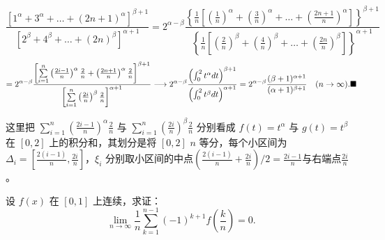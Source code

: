 \documentclass[lang=cn,newtx,10pt,scheme=chinese]{elegantbook}
\begin{document}
\begin{solution}

$$ \frac{[1^\alpha + 3^\alpha + \dots + (2n+1)^\alpha]^{\beta+1}}{[2^\beta + 4^\beta + \dots + (2n)^\beta]^{\alpha+1}} = 2^{\alpha-\beta} \frac{\left\{ \frac{1}{n} \left[ \left(\frac{1}{n}\right)^\alpha + \left(\frac{3}{n}\right)^\alpha + \dots + \left(\frac{2n+1}{n}\right)^\alpha \right] \right\}^{\beta+1}}{\left\{ \frac{1}{n} \left[ \left(\frac{2}{n}\right)^\beta + \left(\frac{4}{n}\right)^\beta + \dots + \left(\frac{2n}{n}\right)^\beta \right] \right\}^{\alpha+1}} $$
$$ = 2^{\alpha-\beta} \frac{\left[ \sum\limits_{i=1}^{n} \left(\frac{2i-1}{n}\right)^\alpha \frac{2}{n} + \left(\frac{2n+1}{n}\right)^\alpha \frac{2}{n} \right]^{\beta+1}}{\left[ \sum\limits_{i=1}^{n} \left(\frac{2i}{n}\right)^\beta \frac{2}{n} \right]^{\alpha+1}} \longrightarrow 2^{\alpha-\beta} \frac{\left( \int_0^2 t^\alpha dt \right)^{\beta+1}}{\left( \int_0^2 t^\beta dt \right)^{\alpha+1}} = 2^{\alpha-\beta} \frac{(\beta+1)^{\alpha+1}}{(\alpha+1)^{\beta+1}} \quad (n \to \infty). \hfill \blacksquare$$ 
\begin{remark}
这里把 $\sum\limits_{i=1}^{n} \left(\frac{2i-1}{n}\right)^\alpha \frac{2}{n}$ 与 $\sum\limits_{i=1}^{n} \left(\frac{2i}{n}\right)^\beta \frac{2}{n}$ 分别看成 $f(t) = t^\alpha$ 与 $g(t) = t^\beta$ 在 $[0,2]$ 上的积分和，其划分是将 $[0,2]$ $n$ 等分，每个小区间为$\Delta_i = [\frac{2(i-1)}{n},\frac{2i}{n}]$，$\xi_i$ 分别取小区间的中点$(\frac{2(i-1)}{n} + \frac{2i}{n})/2 = \frac{2i-1}{n}$与右端点$\frac{2i}{n}$。 
\end{remark}
\end{solution}

\begin{exercise}
设 $f(x)$ 在 $[0,1]$ 上连续，求证：
$$ \lim_{n \to \infty} \frac{1}{n} \sum_{k=1}^{n-1} (-1)^{k+1} f\left(\frac{k}{n}\right) = 0.  $$
\end{exercise}
\end{document}
